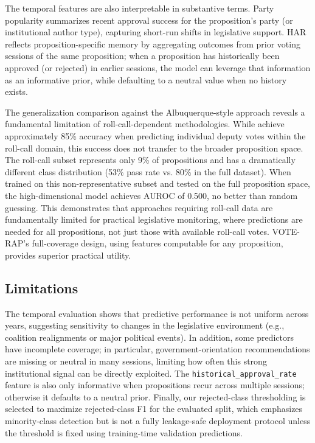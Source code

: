 \documentclass[review]{elsarticle}
\begin{document}
The temporal features are also interpretable in substantive terms. Party popularity summarizes recent approval success for the proposition's party (or institutional author type), capturing short-run shifts in legislative support. HAR reflects proposition-specific memory by aggregating outcomes from prior voting sessions of the same proposition; when a proposition has historically been approved (or rejected) in earlier sessions, the model can leverage that information as an informative prior, while defaulting to a neutral value when no history exists.

\par
The generalization comparison against the Albuquerque-style approach reveals a fundamental limitation of roll-call-dependent methodologies. While \citet{Albuquerque2025Forecasting} achieve approximately 85\% accuracy when predicting individual deputy votes within the roll-call domain, this success does not transfer to the broader proposition space. The roll-call subset represents only 9\% of propositions and has a dramatically different class distribution (53\% pass rate vs. 80\% in the full dataset). When trained on this non-representative subset and tested on the full proposition space, the high-dimensional model achieves AUROC of 0.500, no better than random guessing. This demonstrates that approaches requiring roll-call data are fundamentally limited for practical legislative monitoring, where predictions are needed for all propositions, not just those with available roll-call votes. VOTE-RAP's full-coverage design, using features computable for any proposition, provides superior practical utility.


\subsection{Limitations}
The temporal evaluation shows that predictive performance is not uniform across years, suggesting sensitivity to changes in the legislative environment (e.g., coalition realignments or major political events). In addition, some predictors have incomplete coverage; in particular, government-orientation recommendations are missing or neutral in many sessions, limiting how often this strong institutional signal can be directly exploited. The \texttt{historical\_\allowbreak approval\_\allowbreak rate} feature is also only informative when propositions recur across multiple sessions; otherwise it defaults to a neutral prior. Finally, our rejected-class thresholding is selected to maximize rejected-class F1 for the evaluated split, which emphasizes minority-class detection but is not a fully leakage-safe deployment protocol unless the threshold is fixed using training-time validation predictions.
\end{document}
